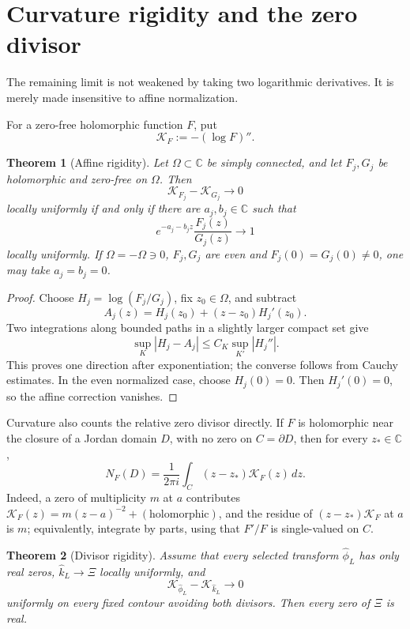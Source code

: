 \documentclass[11pt]{amsart}
\newtheorem{theorem}{Theorem}[section]
\theoremstyle{definition}
\theoremstyle{remark}
\newcommand{\C}{\mathbb C}
\newcommand{\XiR}{\Xi}
\begin{document}
\section{Curvature rigidity and the zero divisor}
\label{sec:rigidity}

The remaining limit is not weakened by taking two logarithmic derivatives.
It is merely made insensitive to affine normalization.

For a zero-free holomorphic function \(F\), put
\[
 \mathcal K_F:=-(\log F)''.
\]

\begin{theorem}[Affine rigidity]
\label{thm:affine-rigidity}
Let \(\Omega\subset\C\) be simply connected, and let \(F_j,G_j\) be
holomorphic and zero-free on \(\Omega\).  Then
\[
 \mathcal K_{F_j}-\mathcal K_{G_j}\longrightarrow0
\]
locally uniformly if and only if there are \(a_j,b_j\in\C\) such that
\[
 e^{-a_j-b_jz}\frac{F_j(z)}{G_j(z)}\longrightarrow1
\]
locally uniformly.  If
\(\Omega=-\Omega\ni0\), \(F_j,G_j\) are even and \(F_j(0)=G_j(0)\ne0\), one
may take \(a_j=b_j=0\).
\end{theorem}

\begin{proof}
Choose \(H_j=\log(F_j/G_j)\), fix \(z_0\in\Omega\), and subtract
\[
 A_j(z)=H_j(z_0)+(z-z_0)H_j'(z_0).
\]
Two integrations along bounded paths in a slightly larger compact set give
\[
 \sup_K|H_j-A_j|\le C_K\sup_{K'}|H_j''|.
\]
This proves one direction after exponentiation; the converse follows from
Cauchy estimates.  In the even normalized case, choose \(H_j(0)=0\).
Then \(H_j'(0)=0\), so the affine correction vanishes.
\end{proof}

Curvature also counts the relative zero divisor directly.  If \(F\) is
holomorphic near the closure of a Jordan domain \(D\), with no zero on
\(C=\partial D\), then for every \(z_*\in\C\),
\[
 \boxed{
 N_F(D)=\frac1{2\pi i}\int_C(z-z_*)\mathcal K_F(z)\,dz.}
 \tag{12.1}
\]
Indeed, a zero of multiplicity \(m\) at \(a\) contributes
\(\mathcal K_F(z)=m(z-a)^{-2}+(\text{holomorphic})\), and the residue of
\((z-z_*)\mathcal K_F\) at \(a\) is \(m\); equivalently, integrate by parts,
using that \(F'/F\) is single-valued on \(C\).

\begin{theorem}[Divisor rigidity]
\label{thm:divisor-rigidity}
Assume that every selected transform \(\widehat\phi_L\) has only real
zeros, \(\widehat k_L\to\XiR\) locally uniformly, and
\[
 \mathcal K_{\widehat\phi_L}-\mathcal K_{\widehat k_L}\longrightarrow0
\]
uniformly on every fixed contour avoiding both divisors.  Then every zero
of \(\XiR\) is real.
\end{theorem}
\end{document}
